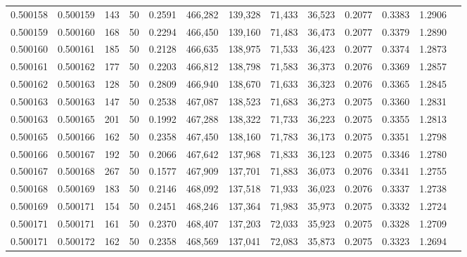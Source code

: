 \begin{tabular}{rrrrrrrrrrrrr}
0.500158 & 0.500159 & 143 &  50 &                                     0.2591 & 466,282 & 139,328 &  71,433 &  36,523 & 0.2077 & 0.3383 & 1.2906 \\
0.500159 & 0.500160 & 168 &  50 &                                     0.2294 & 466,450 & 139,160 &  71,483 &  36,473 & 0.2077 & 0.3379 & 1.2890 \\
0.500160 & 0.500161 & 185 &  50 &                                     0.2128 & 466,635 & 138,975 &  71,533 &  36,423 & 0.2077 & 0.3374 & 1.2873 \\
0.500161 & 0.500162 & 177 &  50 &                                     0.2203 & 466,812 & 138,798 &  71,583 &  36,373 & 0.2076 & 0.3369 & 1.2857 \\
0.500162 & 0.500163 & 128 &  50 &                                     0.2809 & 466,940 & 138,670 &  71,633 &  36,323 & 0.2076 & 0.3365 & 1.2845 \\
0.500163 & 0.500163 & 147 &  50 &                                     0.2538 & 467,087 & 138,523 &  71,683 &  36,273 & 0.2075 & 0.3360 & 1.2831 \\
0.500163 & 0.500165 & 201 &  50 &                                     0.1992 & 467,288 & 138,322 &  71,733 &  36,223 & 0.2075 & 0.3355 & 1.2813 \\
0.500165 & 0.500166 & 162 &  50 &                                     0.2358 & 467,450 & 138,160 &  71,783 &  36,173 & 0.2075 & 0.3351 & 1.2798 \\
0.500166 & 0.500167 & 192 &  50 &                                     0.2066 & 467,642 & 137,968 &  71,833 &  36,123 & 0.2075 & 0.3346 & 1.2780 \\
0.500167 & 0.500168 & 267 &  50 &                                     0.1577 & 467,909 & 137,701 &  71,883 &  36,073 & 0.2076 & 0.3341 & 1.2755 \\
0.500168 & 0.500169 & 183 &  50 &                                     0.2146 & 468,092 & 137,518 &  71,933 &  36,023 & 0.2076 & 0.3337 & 1.2738 \\
0.500169 & 0.500171 & 154 &  50 &                                     0.2451 & 468,246 & 137,364 &  71,983 &  35,973 & 0.2075 & 0.3332 & 1.2724 \\
0.500171 & 0.500171 & 161 &  50 &                                     0.2370 & 468,407 & 137,203 &  72,033 &  35,923 & 0.2075 & 0.3328 & 1.2709 \\
0.500171 & 0.500172 & 162 &  50 &                                     0.2358 & 468,569 & 137,041 &  72,083 &  35,873 & 0.2075 & 0.3323 & 1.2694 \\

\end{tabular}
